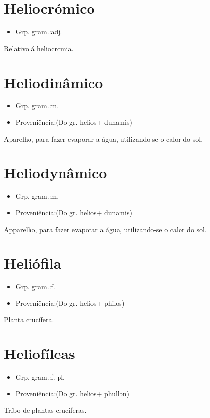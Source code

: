 \documentclass{article}
\begin{document}
\section{Heliocrómico}
\begin{itemize}
\item {Grp. gram.:adj.}
\end{itemize}
Relativo á heliocromia.
\section{Heliodinâmico}
\begin{itemize}
\item {Grp. gram.:m.}
\end{itemize}
\begin{itemize}
\item {Proveniência:(Do gr. \textunderscore helios\textunderscore  + \textunderscore dunamis\textunderscore )}
\end{itemize}
Aparelho, para fazer evaporar a água, utilizando-se o calor do sol.
\section{Heliodynâmico}
\begin{itemize}
\item {Grp. gram.:m.}
\end{itemize}
\begin{itemize}
\item {Proveniência:(Do gr. \textunderscore helios\textunderscore  + \textunderscore dunamis\textunderscore )}
\end{itemize}
Apparelho, para fazer evaporar a água, utilizando-se o calor do sol.
\section{Heliófila}
\begin{itemize}
\item {Grp. gram.:f.}
\end{itemize}
\begin{itemize}
\item {Proveniência:(Do gr. \textunderscore helios\textunderscore  + \textunderscore philos\textunderscore )}
\end{itemize}
Planta crucífera.
\section{Heliofíleas}
\begin{itemize}
\item {Grp. gram.:f. pl.}
\end{itemize}
\begin{itemize}
\item {Proveniência:(Do gr. \textunderscore helios\textunderscore  + \textunderscore phullon\textunderscore )}
\end{itemize}
Tríbo de plantas crucíferas.
\end{document}
